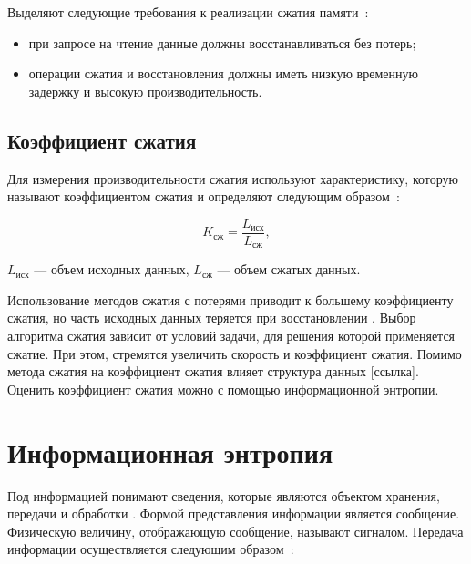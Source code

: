 
Выделяют следующие требования к реализации сжатия памяти~\cite{compression-requirements}:

\begin{itemize}
	\item при запросе на чтение данные должны восстанавливаться без потерь;
	\item операции сжатия и восстановления должны иметь низкую временную задержку и высокую производительность.
\end{itemize}

\subsection{Коэффициент сжатия}

Для измерения производительности сжатия используют характеристику, которую называют коэффициентом сжатия и определяют следующим образом~\cite{compression-coefficient}:

\begin{equation}
	K_{\text{сж}} = \frac{L_{\text{исх}}}{L_{\text{сж}}},
\end{equation}

 $L_{\text{исх}}$ --- объем исходных данных, $L_{\text{сж}}$ --- объем сжатых данных.

Использование методов сжатия с потерями приводит к большему коэффициенту сжатия, но часть исходных данных теряется при восстановлении \cite{compression-definition}. Выбор алгоритма сжатия зависит от условий задачи, для решения которой применяется сжатие. При этом, стремятся увеличить скорость и коэффициент сжатия. Помимо метода сжатия на коэффициент сжатия влияет структура данных [ссылка]. Оценить коэффициент сжатия можно с помощью информационной энтропии.

\section{Информационная энтропия}\label{ientropy}

Под информацией понимают сведения, которые являются объектом хранения, передачи и обработки \cite{information}. Формой представления информации является сообщение. Физическую величину, отображающую сообщение, называют сигналом. Передача информации осуществляется следующим образом~\cite{transmission}:

